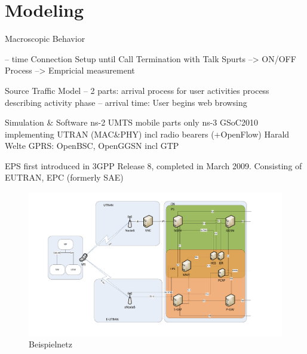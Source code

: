 \section{Modeling}
Macroscopic Behavior

	-- time Connection Setup until Call Termination with Talk Spurts
	--> ON/OFF Process
	--> Empricial measurement
	
Source Traffic Model
	-- 2 parts: 
		arrival process for user activities
		process describing activity phase
	-- arrival time:
		User begins web browsing
	
Simulation \& Software
	ns-2 UMTS mobile parts only
	ns-3 GSoC2010 implementing \ac{UTRAN} (MAC\&PHY) incl radio bearers (+OpenFlow)
	Harald Welte GPRS: OpenBSC, OpenGGSN incl GTP
	

EPS first introduced in 3GPP Release 8, completed in March 2009. Consisting of EUTRAN, EPC (formerly SAE)


	


\begin{figure}[htbp]
 \centering
 \includegraphics[width=1.0\textwidth]{images/3gpp/eps_ps-overview.pdf}
 \caption{Beispielnetz}\label{fig:netzwerk2}
\end{figure}

